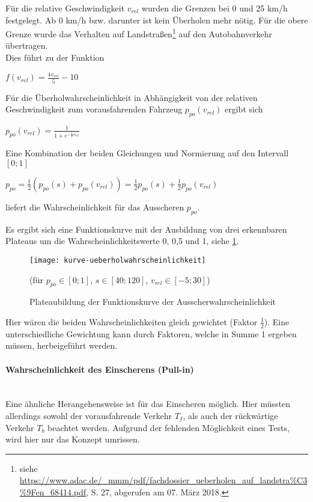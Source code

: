 \noindent
Für die relative Geschwindigkeit $ v_{rel} $ wurden die Grenzen bei 0 und 25 km/h festgelegt.
Ab 0 km/h bzw. darunter ist kein Überholen mehr nötig.
Für die obere Grenze wurde das Verhalten auf Landstraßen\footnote{siehe \url{https://www.adac.de/_mmm/pdf/fachdossier_ueberholen_auf_landstra\%C3\%9Fen_68414.pdf}, S. 27, abgerufen am 07. März 2018.}
auf den Autobahnverkehr übertragen.
\\
Dies führt zu der Funktion 
\begin{center}
$ f(v_{rel}) = \frac{4 v_{rel}}{5} - 10 $
\end{center}
Für die Überholwahrscheinlichkeit in Abhängigkeit von der relativen Geschwindigkeit zum vorausfahrenden Fahrzeug $ p_{po}(v_{rel}) $ ergibt sich
\begin{center}
$ p_{po}(v_{rel}) = \frac{1}{1 + e^{-\frac{1}{2}v_{rel}}} $
\end{center}

\noindent
Eine Kombination der beiden Gleichungen und Normierung auf den Intervall $ [0; 1] $
\begin{center}
$ p_{po} = \frac{1}{2}(p_{po}(s) + p_{po}(v_{rel})) = \frac{1}{2}p_{po}(s) + \frac{1}{2}p_{po}(v_{rel}) $
\end{center}
liefert die Wahrscheinlichkeit für das Ausscheren $ p_{po} $.

Es ergibt sich eine Funktionskurve mit der Ausbildung von drei erkennbaren Plateaus um die Wahrscheinlichkeitswerte 0, 0,5 und 1, siehe \cref{figure:kurve-ueberholwahrscheinlichkeit}.

\begin{figure}[hptb]
 \centering
 \texttt{[image: kurve-ueberholwahrscheinlichkeit]}
 \caption[Funktionskurve für die Ausscherwahrscheinlichkeit]
 		 {Plateaubildung der Funktionskurve der Ausscherwahrscheinlichkeit}
 		 {\footnotesize(für $ p_{po} \in [0; 1] $, $ s \in [ 40; 120 ] $, $ v_{rel} \in [ -5; 30 ] $)}
 \label{figure:kurve-ueberholwahrscheinlichkeit}
\end{figure} 

Hier wären die beiden Wahrscheinlichkeiten gleich gewichtet (Faktor $ \frac{1}{2} $). Eine unterschiedliche Gewichtung kann durch Faktoren, welche in Summe 1 ergeben müssen, herbeigeführt werden.

\paragraph*{Wahrscheinlichkeit des Einscherens (Pull-in)} 
\hfill \\
Eine ähnliche Herangehensweise ist für das Einscheren möglich.
Hier müssten allerdings sowohl der vorausfahrende Verkehr $ T_{f} $, als auch der rückwärtige Verkehr $ T_{b} $ beachtet werden. 
Aufgrund der fehlenden Möglichkeit eines Tests, wird hier nur das Konzept umrissen.

